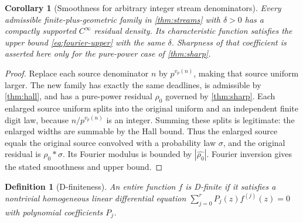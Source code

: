 \documentclass[11pt,a4paper]{article}
\newtheorem{corollary}[theorem]{Corollary}
\newtheorem{definition}[theorem]{Definition}
\theoremstyle{remark}
\newcommand{\cf}[1]{\widehat{#1}}
\begin{document}
\begin{corollary}[Smoothness for arbitrary integer stream denominators]
\label{cor:general-smooth}
Every admissible finite-plus-geometric family in \cref{thm:streams} with
$\delta>0$ has a compactly supported $C^\infty$ residual density. Its
characteristic function satisfies the upper bound \eqref{eq:fourier-upper}
with the same $\delta$. Sharpness of that coefficient is asserted here only
for the pure-power case of \cref{thm:sharp}.
\end{corollary}
\begin{proof}
Replace each source denominator $n$ by $p^{v_p(n)}$, making that source uniform
larger. The new family has exactly the same deadlines, is admissible by
\cref{thm:hall}, and has a pure-power residual $\rho_0$ governed by
\cref{thm:sharp}. Each enlarged source uniform splits into the original
uniform and an independent finite digit law, because $n/p^{v_p(n)}$ is an
integer. Summing these splits is legitimate: the enlarged widths are summable
by the Hall bound. Thus the enlarged source equals the original source
convolved with a probability law $\sigma$, and the original residual is
$\rho_0*\sigma$. Its Fourier modulus is bounded by $|\cf{\rho_0}|$.
Fourier inversion gives the stated smoothness and upper bound.
\end{proof}

\begin{definition}[D-finiteness]
An entire function $f$ is D-finite if it satisfies a nontrivial homogeneous
linear differential equation
$\sum_{j=0}^{r}P_j(z)f^{(j)}(z)=0$ with polynomial coefficients $P_j$.
\end{definition}
\end{document}
